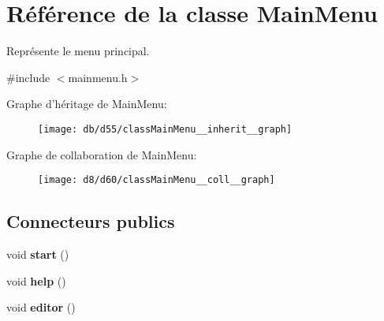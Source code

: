 \hypertarget{classMainMenu}{\section{Référence de la classe Main\+Menu}
\label{classMainMenu}
}


Représente le menu principal.  




{\ttfamily \#include $<$mainmenu.\+h$>$}



Graphe d'héritage de Main\+Menu\+:\nopagebreak
\begin{figure}[H]
\begin{center}
\leavevmode
\texttt{[image: db/d55/classMainMenu\_\_inherit\_\_graph]}
\end{center}
\end{figure}


Graphe de collaboration de Main\+Menu\+:\nopagebreak
\begin{figure}[H]
\begin{center}
\leavevmode
\texttt{[image: d8/d60/classMainMenu\_\_coll\_\_graph]}
\end{center}
\end{figure}
\subsection*{Connecteurs publics}
\begin{DoxyCompactItemize}
\item 
\hypertarget{classMainMenu_af13a5defbd470cb18edc59d14668aaf4}{void {\bfseries start} ()}\label{classMainMenu_af13a5defbd470cb18edc59d14668aaf4}

\item 
\hypertarget{classMainMenu_aea2e199d621268d691f1aebb7a8f2e31}{void {\bfseries help} ()}\label{classMainMenu_aea2e199d621268d691f1aebb7a8f2e31}

\item 
\hypertarget{classMainMenu_adbce95d3c2192a684d25e6bf2417f073}{void {\bfseries editor} ()}\label{classMainMenu_adbce95d3c2192a684d25e6bf2417f073}

\end{DoxyCompactItemize}
